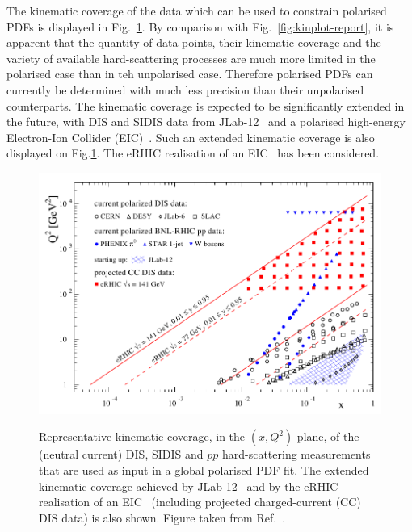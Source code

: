 The kinematic coverage of the data which can be used to constrain polarised 
PDFs is displayed in Fig.~\ref{fig:kinEIC}.
%
By comparison with Fig.~\ref{fig:kinplot-report}, it is apparent that the
quantity of data points, their kinematic coverage and the variety of 
available hard-scattering processes are much more limited in the polarised case
than in teh unpolarised case.
%
Therefore polarised PDFs can currently be determined with much less 
precision than their unpolarised counterparts.
%
The kinematic coverage is expected to be significantly extended in the future,
with DIS and SIDIS data from JLab-12~\cite{Dudek:2012vr} and a polarised 
high-energy Electron-Ion Collider (EIC)~\cite{Accardi:2012qut}.
%
Such an extended kinematic coverage is also displayed on Fig.\ref{fig:kinEIC}.
%
The eRHIC realisation of an EIC~\cite{Aschenauer:2014cki} has been considered.

\begin{figure}[!t]
\centering
\includegraphics[width=\textwidth]{plots/kinEIC}\\
\caption{\small Representative kinematic coverage, in the $(x,Q^2)$ plane,
of the (neutral current) DIS, SIDIS and $pp$ hard-scattering measurements 
that are used as input in a global polarised PDF fit.
%
The extended kinematic coverage achieved by 
JLab-12~\cite{Dudek:2012vr} and by the eRHIC~\cite{Aschenauer:2014cki} 
realisation of an EIC~\cite{Accardi:2012qut}
(including projected charged-current (CC) DIS data) is also shown.
%
Figure taken from Ref.~\cite{Aschenauer:2014cki}.}
\label{fig:kinEIC}
\end{figure}


